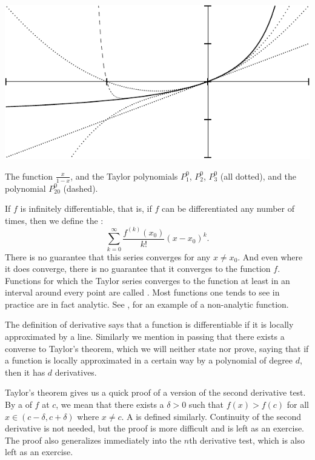 \begin{myfigureht}
\includegraphics{figures/taylorgeom}
\caption{The function $\frac{x}{1-x}$, and the Taylor polynomials
$P_1^0$, $P_2^0$, $P_3^0$ (all dotted), and the polynomial $P_{20}^0$
(dashed).\label{fig:taylorgeom}}
\end{myfigureht}

If $f$ is infinitely differentiable, that is, if $f$ can be
differentiated any number of times, then 
we define the \emph{}:
\begin{equation*}
\sum_{k=0}^\infty
\frac{f^{(k)}(x_0)}{k!}{(x-x_0)}^k .
\end{equation*}
There is no guarantee that this series converges for any
$x \not= x_0$.  And even where it does converge, there is no guarantee
that it converges to the function $f$.  Functions for which
the Taylor series converges to the function at least in an interval
around every point are called
\emph{}.
Most functions one tends to see in practice are in fact analytic.
See , for an example of a non-analytic
function.

\medskip

The definition of derivative says that
a function is
differentiable if it
is locally approximated by a line.
Similarly we mention in passing that there exists a converse to Taylor's
theorem,
which we will neither state nor prove,
saying that if a function is
locally approximated in a certain way by a polynomial of degree $d$, then it
has $d$ derivatives.

\medskip

Taylor's theorem gives us a quick proof of a version of
the second derivative test.
By a \emph{} of $f$ at $c$,
we mean that there exists a $\delta > 0$ such that $f(x) > f(c)$ for
all $x \in (c-\delta,c+\delta)$ where $x\not=c$.
A \emph{} is defined similarly.
Continuity of the second derivative is not needed, but the proof is more
difficult and is left as an exercise.  The proof also generalizes
immediately into the $n$th derivative test, which is also left as
an exercise.

